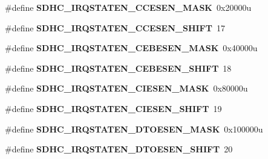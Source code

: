 \begin{DoxyCompactItemize}
\item 
\#define {\bfseries S\+D\+H\+C\+\_\+\+I\+R\+Q\+S\+T\+A\+T\+E\+N\+\_\+\+C\+C\+E\+S\+E\+N\+\_\+\+M\+A\+SK}~0x20000u\hypertarget{group__SDHC__Register__Masks_gab4c7b840945f9d7fbc1912e6b210ab77}{}\label{group__SDHC__Register__Masks_gab4c7b840945f9d7fbc1912e6b210ab77}

\item 
\#define {\bfseries S\+D\+H\+C\+\_\+\+I\+R\+Q\+S\+T\+A\+T\+E\+N\+\_\+\+C\+C\+E\+S\+E\+N\+\_\+\+S\+H\+I\+FT}~17\hypertarget{group__SDHC__Register__Masks_ga373ff5b200a397f6c4a71a9e831ee6c8}{}\label{group__SDHC__Register__Masks_ga373ff5b200a397f6c4a71a9e831ee6c8}

\item 
\#define {\bfseries S\+D\+H\+C\+\_\+\+I\+R\+Q\+S\+T\+A\+T\+E\+N\+\_\+\+C\+E\+B\+E\+S\+E\+N\+\_\+\+M\+A\+SK}~0x40000u\hypertarget{group__SDHC__Register__Masks_gadb32296ea39bd0cd1cd2d5719365c49a}{}\label{group__SDHC__Register__Masks_gadb32296ea39bd0cd1cd2d5719365c49a}

\item 
\#define {\bfseries S\+D\+H\+C\+\_\+\+I\+R\+Q\+S\+T\+A\+T\+E\+N\+\_\+\+C\+E\+B\+E\+S\+E\+N\+\_\+\+S\+H\+I\+FT}~18\hypertarget{group__SDHC__Register__Masks_ga72fbf9bf13c5e322d4671010c7719927}{}\label{group__SDHC__Register__Masks_ga72fbf9bf13c5e322d4671010c7719927}

\item 
\#define {\bfseries S\+D\+H\+C\+\_\+\+I\+R\+Q\+S\+T\+A\+T\+E\+N\+\_\+\+C\+I\+E\+S\+E\+N\+\_\+\+M\+A\+SK}~0x80000u\hypertarget{group__SDHC__Register__Masks_gaa59f05865a6f6434fd4fcf216a4d522a}{}\label{group__SDHC__Register__Masks_gaa59f05865a6f6434fd4fcf216a4d522a}

\item 
\#define {\bfseries S\+D\+H\+C\+\_\+\+I\+R\+Q\+S\+T\+A\+T\+E\+N\+\_\+\+C\+I\+E\+S\+E\+N\+\_\+\+S\+H\+I\+FT}~19\hypertarget{group__SDHC__Register__Masks_ga5db5c25cea330a48bbd4e8439f6eca8d}{}\label{group__SDHC__Register__Masks_ga5db5c25cea330a48bbd4e8439f6eca8d}

\item 
\#define {\bfseries S\+D\+H\+C\+\_\+\+I\+R\+Q\+S\+T\+A\+T\+E\+N\+\_\+\+D\+T\+O\+E\+S\+E\+N\+\_\+\+M\+A\+SK}~0x100000u\hypertarget{group__SDHC__Register__Masks_ga6e36dd46b6990b4b754e5510d1aa2186}{}\label{group__SDHC__Register__Masks_ga6e36dd46b6990b4b754e5510d1aa2186}

\item 
\#define {\bfseries S\+D\+H\+C\+\_\+\+I\+R\+Q\+S\+T\+A\+T\+E\+N\+\_\+\+D\+T\+O\+E\+S\+E\+N\+\_\+\+S\+H\+I\+FT}~20\hypertarget{group__SDHC__Register__Masks_gaaa65471aa5dc9354ffbc0f74257c7445}{}\label{group__SDHC__Register__Masks_gaaa65471aa5dc9354ffbc0f74257c7445}


\end{DoxyCompactItemize}
